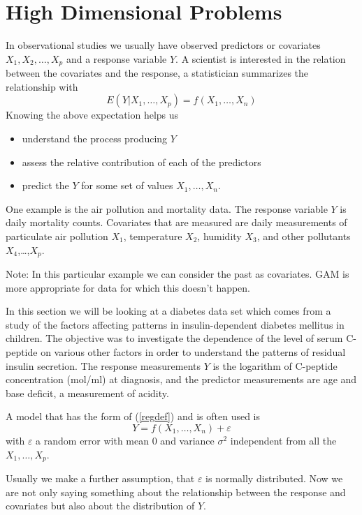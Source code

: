 \chapter{High Dimensional Problems}
In observational studies we usually have  observed predictors or covariates
$X_1,X_2,\dots,X_p$ and a response variable $Y$. A scientist is
interested in the relation between the covariates and the response, a
statistician summarizes the relationship with
\begin{equation}
\label{regdef}
E(Y|X_1,\dots,X_p) = f(X_1,\dots,X_n)
\end{equation}
Knowing the above expectation helps us
\begin{itemize}
\item understand the process producing $Y$
\item assess the relative contribution of each of the predictors
\item predict the $Y$ for some set of values $X_1,\dots,X_n$.
\end{itemize}

One example is the air pollution and mortality data. The response
variable $Y$ is daily mortality counts. Covariates that are measured
are daily 
measurements of particulate air pollution $X_1$, temperature $X_2$,
humidity $X_3$, and other pollutants $X_4$,\dots,$X_p$. 
 
Note: In this particular example we can consider the past
as covariates. GAM is more appropriate for data for which this doesn't
happen. 

In this section we will be looking at a diabetes data set which comes
from a study of the factors affecting patterns in insulin-dependent
diabetes mellitus in children.  The objective was to investigate the
dependence of the level of serum C-peptide on various other factors in
order to understand the patterns of residual insulin secretion. The
response measurements $Y$ is the logarithm of C-peptide concentration
(mol/ml) at diagnosis, and the predictor measurements are age and base
deficit, a measurement of acidity.

A model that has the form of (\ref{regdef}) and is often used is
\begin{equation}
\label{guasreg}
Y = f(X_1,\dots,X_n) + \varepsilon
\end{equation}
with $\varepsilon$ a random error with mean 0 and variance $\sigma^2$
independent from all the $X_1,\dots,X_p$.

Usually we make a further assumption, that $\varepsilon$ is normally
distributed. Now we are not only saying something about the
relationship between the response and covariates but also about the
distribution of $Y$.

